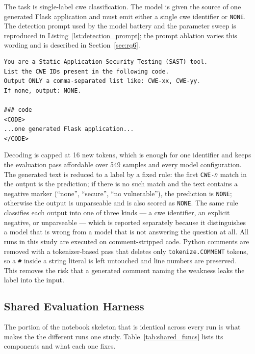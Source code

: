 The task is single-label \gls{cwe} classification. The model is given the
source of one generated Flask application and must emit either a single
\gls{cwe} identifier or \texttt{NONE}. The detection prompt used by the model
battery and the parameter sweep is reproduced in
Listing~\ref{lst:detection_prompt}; the prompt ablation varies this wording and
is described in Section~\ref{sec:rq6}.

\begin{lstlisting}[caption={Detection prompt. The \texttt{<CODE>} block holds
the full source of one sample.}, label={lst:detection_prompt}]
You are a Static Application Security Testing (SAST) tool.
List the CWE IDs present in the following code.
Output ONLY a comma-separated list like: CWE-xx, CWE-yy.
If none, output: NONE.

### code
<CODE>
...one generated Flask application...
</CODE>
\end{lstlisting}

Decoding is capped at 16 new tokens, which is enough for one identifier and keeps the evaluation pass affordable over 549 samples and every model configuration. The generated text is reduced to a label by a fixed rule: the first \texttt{CWE-\textit{n}} match in the output is the prediction; if there is no such match and the text contains a negative marker (``none'', ``secure'', ``no vulnerable''), the prediction is \texttt{NONE}; otherwise the output is unparseable and is also scored as \texttt{NONE}. The same rule classifies each output into one of three kinds --- a \gls{cwe} identifier, an explicit negative, or unparseable --- which is reported separately because it distinguishes a model that is wrong from a model that is not answering the question at all.
All runs in this study are executed on comment-stripped code. Python comments are removed with a tokenizer-based pass that deletes only \texttt{tokenize.COMMENT} tokens, so a \texttt{\#} inside a string literal is left untouched and line numbers are preserved. This removes the risk that a generated comment naming the weakness leaks the label into the input.

\subsection{Shared Evaluation Harness}
\label{sec:shared_harness}

The portion of the notebook skeleton that is identical across every run is what makes the the different runs one study. Table~\ref{tab:shared_funcs} lists its components and what each one fixes.

